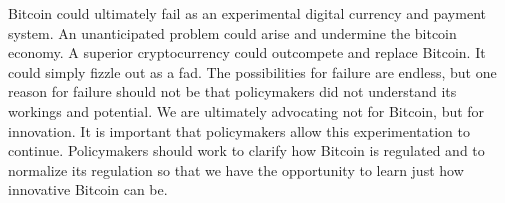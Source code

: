 Bitcoin could ultimately fail as an experimental digital currency
and payment system. An unanticipated problem could arise and
undermine the bitcoin economy. A superior cryptocurrency could
outcompete and replace Bitcoin. It could simply fizzle out as a fad.
The possibilities for failure are endless, but one reason for failure
should not be that policymakers did not understand its workings
and potential. We are ultimately advocating not for Bitcoin, but
for innovation. It is important that policymakers allow this experimentation
to continue. Policymakers should work to clarify how
Bitcoin is regulated and to normalize its regulation so that we have
the opportunity to learn just how innovative Bitcoin can be.
%
%
%
%
\clearpage
{}
%
%

%
%




%
%

